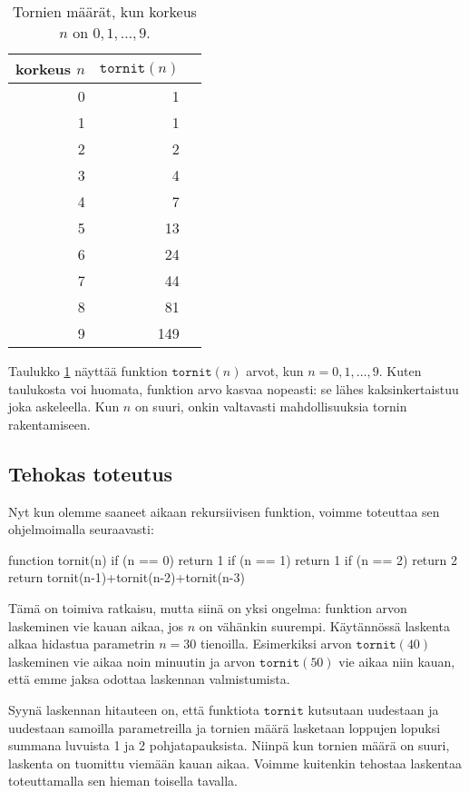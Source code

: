 \begin{table}
\center
\begin{tabular}{rrr}
korkeus $n$ & $\texttt{tornit}(n)$ \\
\hline
0 & 1 \\
1 & 1 \\
2 & 2 \\
3 & 4 \\
4 & 7 \\
5 & 13 \\
6 & 24 \\
7 & 44 \\
8 & 81 \\
9 & 149 \\
\end{tabular}
\caption{Tornien määrät, kun korkeus $n$ on $0,1,\dots,9$.}
\label{tab:dyntor}
\end{table}

Taulukko \ref{tab:dyntor} näyttää funktion
$\texttt{tornit}(n)$ arvot, kun $n=0,1,\dots,9$.
Kuten taulukosta voi huomata, funktion arvo kasvaa nopeasti:
se lähes kaksinkertaistuu joka askeleella.
Kun $n$ on suuri,
onkin valtavasti mahdollisuuksia tornin rakentamiseen.

\subsection{Tehokas toteutus}

Nyt kun olemme saaneet aikaan rekursiivisen funktion,
voimme toteuttaa sen ohjelmoimalla seuraavasti:

\begin{code}
function tornit(n)
    if (n == 0) return 1
    if (n == 1) return 1
    if (n == 2) return 2
    return tornit(n-1)+tornit(n-2)+tornit(n-3)
\end{code}

Tämä on toimiva ratkaisu, mutta siinä on yksi ongelma:
funktion arvon laskeminen vie kauan aikaa, jos $n$ on
vähänkin suurempi.
Käytännössä laskenta alkaa hidastua parametrin $n=30$ tienoilla.
Esimerkiksi arvon $\texttt{tornit}(40)$ laskeminen vie aikaa
noin minuutin ja arvon $\texttt{tornit}(50)$ vie aikaa niin kauan,
että emme jaksa odottaa laskennan valmistumista.

Syynä laskennan hitauteen on, että funktiota $\texttt{tornit}$
kutsutaan uudestaan ja uudestaan samoilla parametreilla
ja tornien määrä lasketaan loppujen lopuksi summana
luvuista 1 ja 2 pohjatapauksista.
Niinpä kun tornien määrä on suuri,
laskenta on tuomittu viemään kauan aikaa.
Voimme kuitenkin tehostaa laskentaa toteuttamalla
sen hieman toisella tavalla.

